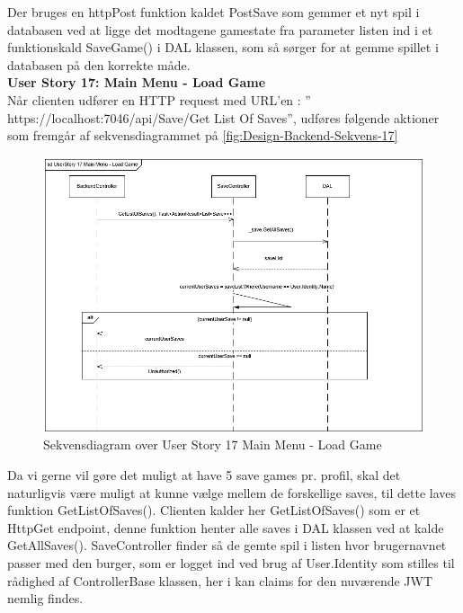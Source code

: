 Der bruges en httpPost funktion kaldet PostSave som gemmer et nyt spil i databasen ved at ligge det modtagene gamestate fra parameter listen ind i et funktionskald SaveGame() i DAL klassen, som så sørger for at gemme spillet i databasen på den korrekte måde.\\

\textbf{User Story 17: Main Menu - Load Game}\\

Når clienten udfører en HTTP request med URL’en : ” https://localhost:7046/api/Save/Get List Of Saves”, udføres følgende aktioner som fremgår af sekvensdiagrammet på \autoref{fig:Design-Backend-Sekvens-17}\\

\begin{figure}[H]
\centering
\includegraphics[width = \textwidth]{02-Body/Images/Backend_sekvens_17.PNG}
\caption{Sekvensdiagram over User Story 17 Main Menu - Load Game}
\label{fig:Design-Backend-Sekvens-17}
\end{figure}

Da vi gerne vil gøre det muligt at have 5 save games pr. profil, skal det naturligvis være muligt at kunne vælge mellem de forskellige saves, til dette laves funktion GetListOfSaves(). Clienten kalder her GetListOfSaves() som er et HttpGet endpoint, denne funktion henter alle saves i DAL klassen ved at kalde GetAllSaves(). SaveController finder så de gemte spil i listen hvor brugernavnet passer med den burger, som er logget ind ved brug af User.Identity som stilles til rådighed af ControllerBase klassen, her i kan claims for den nuværende JWT nemlig findes.\\

